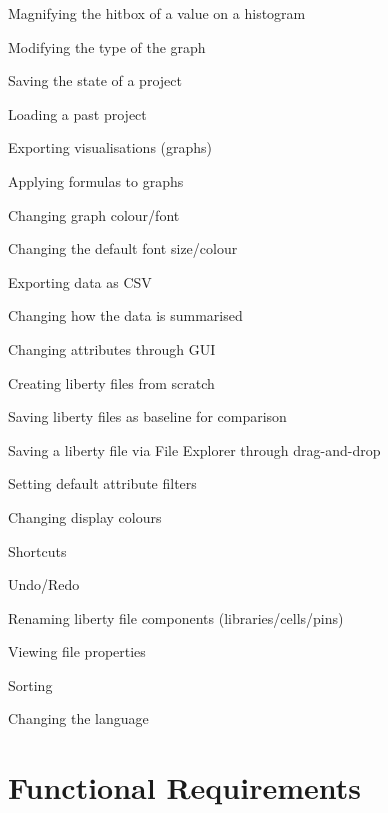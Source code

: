 \documentclass[10pt,a4paper]{report}
\begin{document}
\begin{FRO}
    \item Magnifying the hitbox of a value on a histogram \label{FRO-1}
    \item Modifying the type of the graph \label{FRO-2}
    \item Saving the state of a project \label{FRO-3}
    \item Loading a past project \label{FRO-4}
    \item Exporting visualisations (graphs) \label{FRO-5}
    \item Applying formulas to graphs \label{FRO-6}
    \item Changing graph colour/font \label{FRO-7}
    \item Changing the default font size/colour \label{FRO-8}
    \item Exporting data as CSV \label{FRO-9}
    \item Changing how the data is summarised \label{FRO-10}
    \item Changing attributes through GUI \label{FRO-11}
    \item Creating liberty files from scratch \label{FRO-12}
    \item Saving liberty files as baseline for comparison \label{FRO-13}
    \item Saving a liberty file via File Explorer through drag-and-drop \label{FRO-14}
    \item Setting default attribute filters \label{FRO-15}
    \item Changing display colours \label{FRO-16}
    \item Shortcuts \label{FRO-17}
    \item Undo/Redo \label{FRO-18}
    \item Renaming liberty file components (libraries/cells/pins) \label{FRO-19}
    \item Viewing file properties \label{FRO-20}
    \item Sorting \label{FRO-21}
    \item Changing the language \label{FRO-22}
\end{FRO}

\section{Functional Requirements}
\end{document}
